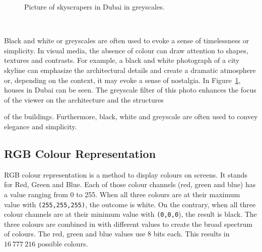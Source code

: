 \documentclass[../MasterThesis.tex]{subfiles}
\begin{document}
\begin{minipage}{0.5\textwidth}
	\begin{figure}[H]
	\begin{center}
		\caption[Picture of skyscrapers in Dubai in greyscales.]{Picture of skyscrapers in Dubai in greyscales.}
		\label{figure:gray}
	\end{center}
\end{figure}\hfill
\end{minipage}\begin{minipage}{0.05\textwidth}
	\ 
\end{minipage}\begin{minipage}{0.45\textwidth}
	Black and white or greyscales are often used to evoke a sense of timelessness or simplicity. In visual media, the absence of colour can draw attention to shapes, textures and contrasts. For example, a black and white photograph of a city skyline can emphasize the architectural details and create a dramatic atmosphere or, depending on the context, it may evoke a sense of nostalgia.
	In Figure~\ref{figure:gray}, houses in Dubai can be seen. The greyscale filter of this photo enhances the focus of the viewer on the architecture and the structures

	
\end{minipage}

\vspace*{-0.6em}
 of the buildings. Furthermore, black, white and greyscale are often used to convey elegance and simplicity.~\cite{colour2}


%





\subsection{RGB Colour Representation}
\label{subsection:RGB}


RGB colour representation is a method to display colours on screens. It stands for Red, Green and Blue. 
Each of those colour channels (red, green and blue) has a value ranging from 0 to 255. When all three colours are at their maximum value with \texttt{(255,255,255)}, the outcome is white. On the contrary, when all three colour channels are at their minimum value with \texttt{(0,0,0}), the result is black.
%
The three colours are combined in with different values to create the broad spectrum of colours. The red, green and blue values use 8 bits each. This results in $16\ 777\ 216$ possible colours.~\cite{colourRGB}
\end{document}
